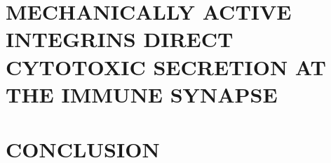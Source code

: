 \documentclass[phd,tocprelim]{cornell}
\begin{document}
\chapter{MECHANICALLY ACTIVE INTEGRINS DIRECT CYTOTOXIC SECRETION AT THE IMMUNE SYNAPSE}
\label{chap:lfa1}


\chapter{CONCLUSION}
\label{chap:conclusion}

%
%


\end{document}
